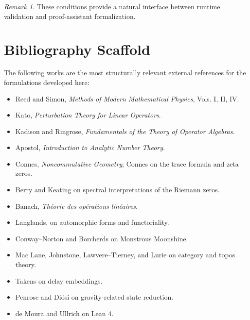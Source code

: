 \documentclass[11pt]{article}
\theoremstyle{plain}
\theoremstyle{definition}
\theoremstyle{remark}
\newtheorem{remark}[theorem]{Remark}
\begin{document}
\begin{remark}
These conditions provide a natural interface between runtime validation and proof-assistant formalization.
\end{remark}

\section{Bibliography Scaffold}

The following works are the most structurally relevant external references for the formulations developed here:

\begin{itemize}
    \item Reed and Simon, \emph{Methods of Modern Mathematical Physics}, Vols. I, II, IV.
    \item Kato, \emph{Perturbation Theory for Linear Operators}.
    \item Kadison and Ringrose, \emph{Fundamentals of the Theory of Operator Algebras}.
    \item Apostol, \emph{Introduction to Analytic Number Theory}.
    \item Connes, \emph{Noncommutative Geometry}; Connes on the trace formula and zeta zeros.
    \item Berry and Keating on spectral interpretations of the Riemann zeros.
    \item Banach, \emph{Théorie des opérations linéaires}.
    \item Langlands, on automorphic forms and functoriality.
    \item Conway--Norton and Borcherds on Monstrous Moonshine.
    \item Mac Lane, Johnstone, Lawvere--Tierney, and Lurie on category and topos theory.
    \item Takens on delay embeddings.
    \item Penrose and Diósi on gravity-related state reduction.
    \item de Moura and Ullrich on Lean 4.
\end{itemize}

\vspace{1em}


\nocite{*}
  

\end{document}
